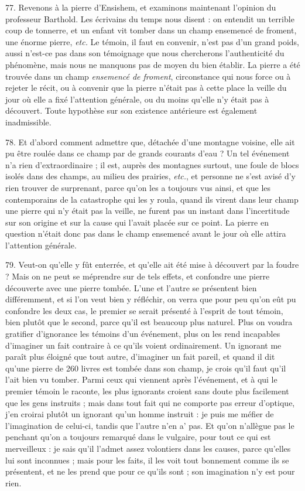 \documentclass[a4paper, 11pt, oneside, polutonikogreek, french]{article}
\begin{document}
77. Revenons à la pierre d'Ensishem, et examinons maintenant l'opinion du professeur Barthold. Les écrivains du temps nous disent : \og on entendit un terrible coup de tonnerre, et un enfant vit tomber dans un champ ensemencé de froment, une énorme pierre, \emph{etc.} Le témoin, il faut en convenir, n'est pas d'un grand poids, aussi n'est-ce pas dans son témoignage que nous chercherons l'authenticité du phénomène, mais nous ne manquons pas de moyen du bien établir. La pierre a été trouvée dans un champ \emph{ensemencé de froment}, circonstance qui nous force ou à rejeter le récit, ou à convenir que la pierre n'était pas à cette place la veille du jour où elle a fixé l'attention générale, ou du moins qu'elle n'y était pas à découvert. Toute hypothèse sur son existence antérieure est également inadmissible. \fg

78. Et d'abord comment admettre que, détachée d'une montagne voisine, elle ait pu être roulée dans ce champ par de grands courants d'eau ? Un tel événement n'a rien d'extraordinaire ; il est, auprès des montagnes surtout, une foule de blocs isolés dans des champs, au milieu des prairies, \emph{etc.}, et personne ne s'est avisé d'y rien trouver de surprenant, parce qu'on les a toujours vus ainsi, et que les contemporains de la catastrophe qui les y roula, quand ils virent dans leur champ une pierre qui n'y était pas la veille, ne furent pas un instant dans l'incertitude sur son origine et sur la cause qui l'avait placée sur ce point. La pierre en question n'était donc pas dans le champ ensemencé avant le jour où elle attira l'attention générale.

79. Veut-on qu'elle y fût enterrée, et qu'elle ait été mise à découvert par la foudre ? Mais on ne peut se méprendre sur de tels effets, et confondre une pierre découverte avec une pierre tombée. L'une et l'autre se présentent bien différemment, et si l'on veut bien y réfléchir, on verra que pour peu qu'on eût pu confondre les deux cas, le premier se serait présenté à l'esprit de tout témoin, bien plutôt que le second, parce qu'il est beaucoup plus naturel. Plus on voudra gratifier d'ignorance les témoins d'un événement, plus on les rend incapables d'imaginer un fait contraire à ce qu'ils voient ordinairement. Un ignorant me paraît plus éloigné que tout autre, d'imaginer un fait pareil, et quand il dit qu'une pierre de 260 livres est tombée dans son champ, je crois qu'il faut qu'il l'ait bien vu tomber. Parmi ceux qui viennent après l'événement, et à qui le premier témoin le raconte, les plus ignorants croient sans doute plus facilement que les gens instruits ; mais dans tout fait qui ne comporte pas erreur d'optique, j'en croirai plutôt un ignorant qu'un homme instruit : je puis me méfier de l'imagination de celui-ci, tandis que l'autre n'en a' pas. Et qu'on n'allègue pas le penchant qu'on a toujours remarqué dans le vulgaire, pour tout ce qui est merveilleux : je sais qu'il l'admet assez volontiers dans les causes, parce qu'elles lui sont inconnues ; mais pour les faits, il les voit tout bonnement comme ils se présentent, et ne les prend que pour ce qu'ils sont ; son imagination n'y est pour rien.
\end{document}
